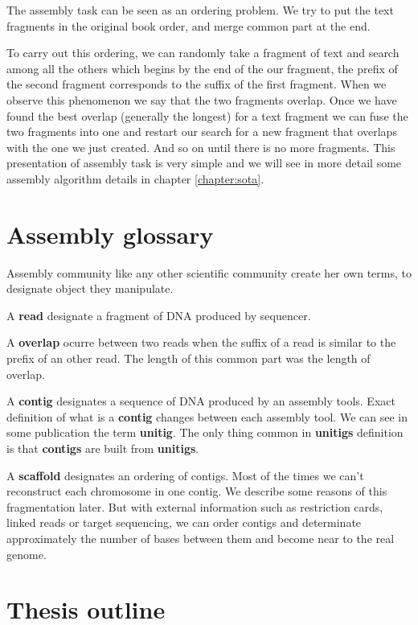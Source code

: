 \documentclass[./main.tex]{subfiles}
\begin{document}
The assembly task can be seen as an ordering problem.%
We try to put the text fragments in the original book order, and merge common part at the end.%

To carry out this ordering, we can randomly take a fragment of text and search among all the others which begins by the end of the our fragment, the prefix of the second fragment corresponds to the suffix of the first fragment. When we observe this phenomenon we say that the two fragments overlap. Once we have found the best overlap (generally the longest) for a text fragment we can fuse the two fragments into one and restart our search for a new fragment that overlaps with the one we just created. And so on until there is no more fragments. This presentation of assembly task is very simple and we will see in more detail some assembly algorithm details in chapter \ref{chapter:sota}.

\section{Assembly glossary} 

Assembly community like any other scientific community create her own terms, to designate object they manipulate.%

A \textbf{read} designate a fragment of DNA produced by sequencer.

A \textbf{overlap} ocurre between two reads when the suffix of a read is similar to the prefix of an other read. The length of this common part was the length of overlap.

A \textbf{contig} designates a sequence of DNA produced by an assembly tools. Exact definition of what is a \textbf{contig} changes between each assembly tool. We can see in some publication the term \textbf{unitig}. The only thing common in \textbf{unitigs} definition is that \textbf{contigs} are built from \textbf{unitigs}.

A \textbf{scaffold} designates an ordering of contigs. Most of the times we can't reconstruct each chromosome in one contig. We describe some reasons of this fragmentation later. But with external information such as restriction cards, linked reads or target sequencing, we can order contigs and determinate approximately the number of bases between them and become near to the real genome.%


\section{Thesis outline}
\end{document}
